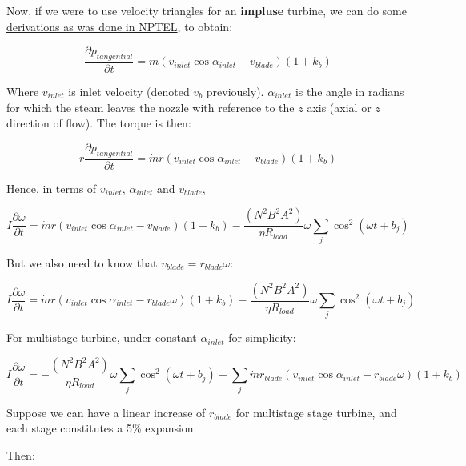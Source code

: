 \documentclass[masters]{ucbthesis}
\renewcommand{\_}{\kern-1.5pt\textunderscore\kern-1.5pt}
\begin{document}
Now, if we were to use velocity triangles for an \textbf{impluse} turbine, 
we can do some 
\href{https://www.youtube.com/watch?v=5YsMPEw-zlM}{derivations as was 
done in NPTEL}, to obtain:

\begin{equation*}
	\frac{\partial p_{tangential}}{\partial t} = 
	\dot{m} (v_{inlet} \cos \alpha_{inlet} - v_{blade}) (1+ k_b)
\end{equation*}

Where $v_{inlet}$ is inlet velocity (denoted $v_b$ previously).
$\alpha_{inlet}$ is the angle in radians for which the steam 
leaves the nozzle with reference to the $z$ axis (axial or 
$z$ direction of flow).
The torque is then:

\begin{equation*}
	r \frac{\partial p_{tangential}}{\partial t} = 
	\dot{m} r (v_{inlet} \cos \alpha_{inlet} - v_{blade}) (1+ k_b)
\end{equation*}

Hence, in terms of $v_{inlet}$, $\alpha_{inlet}$ and $v_{blade}$,

\begin{equation*}
	I \frac{\partial  \omega}{\partial t} = 
	\dot{m} r (v_{inlet} \cos \alpha_{inlet} - v_{blade}) (1+ k_b)
	- \frac{( N^2 B^2 A^2 )}{\eta R_{load} }\omega 
	\sum_j \cos^2 (\omega t + b_j)  
\end{equation*}

But we also need to know that $v_{blade} = r_{blade} \omega$:

\begin{equation*}
	I \frac{\partial  \omega}{\partial t} = 
	\dot{m} r (v_{inlet} \cos \alpha_{inlet} - r_{blade} \omega) (1+ k_b)
	- \frac{( N^2 B^2 A^2 )}{\eta R_{load} }\omega 
	\sum_j \cos^2 (\omega t + b_j)  
\end{equation*}

For multistage turbine, under constant $\alpha_{inlet}$ for simplicity:

\begin{equation*}
	I \frac{\partial  \omega}{\partial t} = 
	- \frac{( N^2 B^2 A^2 )}{\eta R_{load} }\omega 
	\sum_j \cos^2 (\omega t + b_j)  
	+ 
	\sum_j \dot{m} r_{blade}
	(v_{inlet} \cos \alpha_{inlet} - r_{blade} \omega) (1+ k_b)
\end{equation*}

Suppose we can have a linear increase of $r_{blade}$ for multistage
stage turbine, and each stage constitutes a 5\% expansion:

Then:
\end{document}
